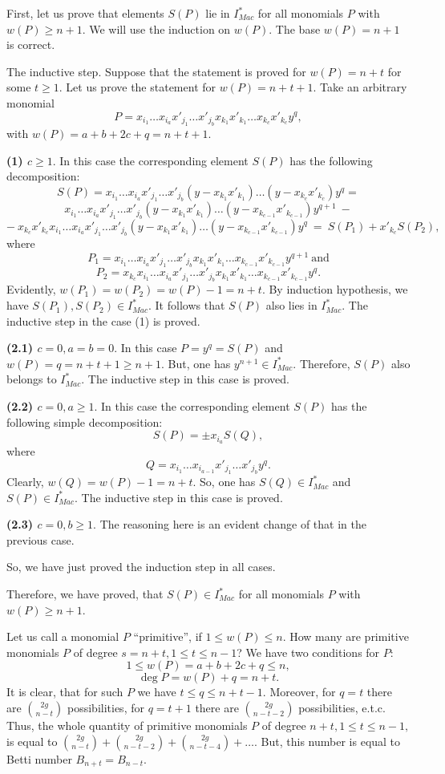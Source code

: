 \documentclass[a4paper,14pt]{article}
\begin{document}
First, let us prove that elements $S(P)$ lie in $I^*_{Mac}$ for all monomials $P$ with $w(P)\ge n+1$. We will use the induction on $w(P)$. The base $w(P)=n+1$ is correct.

The inductive step. Suppose that the statement is proved for $w(P)=n+t$ for some $t\ge 1$. Let us prove the statement for $w(P)=n+t+1$. Take an arbitrary monomial 
$$
P  = x_{i_1}\ldots x_{i_a}x'_{j_1}\ldots x'_{j_b}x_{k_1}x'_{k_1}\ldots x_{k_c}x'_{k_c}y^q,
$$
with $w(P)=a+b+2c+q =n+t+1$.

{\bf (1) $c\ge 1$}. In this case the corresponding element $S(P)$ has the following decomposition:
$$
S(P) = x_{i_1}\ldots x_{i_a}x'_{j_1}\ldots x'_{j_b}(y - x_{k_1}x'_{k_1})\ldots (y - x_{k_c}x'_{k_c})y^q = 
$$
$$
x_{i_1}\ldots x_{i_a}x'_{j_1}\ldots x'_{j_b}(y - x_{k_1}x'_{k_1})\ldots (y - x_{k_{c-1}}x'_{k_{c-1}})y^{q+1} \  - 
$$
$$
-  \  x_{k_c}x'_{k_c}x_{i_1}\ldots x_{i_a}x'_{j_1}\ldots x'_{j_b}(y - x_{k_1}x'_{k_1})\ldots (y - x_{k_{c-1}}x'_{k_{c-1}})y^q \  = \  S(P_1) + x'_{k_c}S(P_2),
$$
where 
$$
P_1 = x_{i_1}\ldots x_{i_a}x'_{j_1}\ldots x'_{j_b}x_{k_1}x'_{k_1}\ldots x_{k_{c-1}}x'_{k_{c-1}}y^{q+1} \  \mathrm{and} 
$$
$$
P_2 = x_{k_c}x_{i_1}\ldots x_{i_a}x'_{j_1}\ldots x'_{j_b}x_{k_1}x'_{k_1}\ldots x_{k_{c-1}}x'_{k_{c-1}}y^q.
$$
Evidently, $w(P_1)=w(P_2)=w(P)-1=n+t$. By induction hypothesis, we have $S(P_1),S(P_2)\in I^*_{Mac}$. It follows that $S(P)$ also lies in $I^*_{Mac}$. The inductive step in the case (1)  is proved. 

{\bf (2.1) $c=0,a=b=0$}. In this case $P=y^q=S(P)$ and $w(P)=q=n+t+1\ge n+1$. But, one has $y^{n+1}\in I^*_{Mac}$. Therefore, $S(P)$ also belongs to $I^*_{Mac}$. The inductive step in this case is proved. 

{\bf (2.2) $c=0,a\ge 1$}. In this case the corresponding element $S(P)$ has the following simple decomposition:
$$
S(P) = \pm x_{i_a} S(Q), 
$$
where
$$
Q =  x_{i_1}\ldots x_{i_{a-1}}x'_{j_1}\ldots x'_{j_b}y^q.
$$
Clearly, $w(Q)=w(P) - 1=n+t$. So, one has $S(Q)\in I^*_{Mac}$ and $S(P)\in I^*_{Mac}$. The inductive step in this case is proved. 

{\bf (2.3) $c=0,b\ge 1$}. The reasoning here is an evident change of that in the previous case.  

So, we have just proved the induction step in all cases. 

Therefore, we have proved, that $S(P)\in I^*_{Mac}$ for all monomials $P$ with $w(P)\ge n+1$.



Let us call a monomial $P$ ``primitive'', if $1\le w(P)\le n$. How many are primitive monomials $P$ of degree $s=n+t, 1\le t\le n-1$? We have two conditions for $P$:
$$
1\le w(P)=a+b+2c+q\le n,
$$
$$
\deg P=w(P)+q=n+t.
$$
It is clear, that for such $P$ we have $t\le q\le n+t -1$. Moreover, for $q=t$ there are $\binom{2g}{n-t}$ possibilities, for $q=t+1$ there are $\binom{2g}{n-t-2}$ possibilities, e.t.c. Thus, the whole quantity of primitive monomials $P$ of degree $n+t, 1\le t\le n-1,$ is equal to $\binom{2g}{n-t} + \binom{2g}{n-t-2} + \binom{2g}{n-t-4} +\ldots$. But, this number is equal to Betti number $B_{n+t}=B_{n-t}$.
\end{document}
